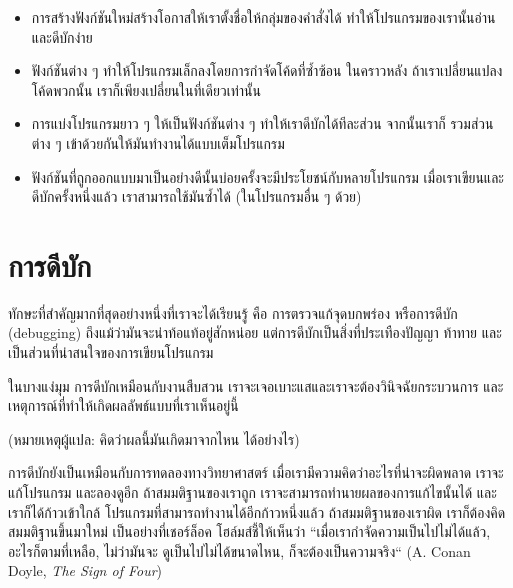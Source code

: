 \begin{itemize}

\item การสร้างฟังก์ชันใหม่สร้างโอกาสให้เราตั้งชื่อให้กลุ่มของคำสั่งได้ ทำให้โปรแกรมของเรานั้นอ่านและดีบักง่าย

\item ฟังก์ชันต่าง ๆ ทำให้โปรแกรมเล็กลงโดยการกำจัดโค้ดที่ซ้ำซ้อน  ในคราวหลัง ถ้าเราเปลี่ยนแปลงโค้ดพวกนั้น 
เราก็เพียงเปลี่ยนในที่เดียวเท่านั้น

\item การแบ่งโปรแกรมยาว ๆ ให้เป็นฟังก์ชันต่าง ๆ ทำให้เราดีบักได้ทีละส่วน จากนั้นเราก็
รวมส่วนต่าง ๆ เข้าด้วยกันให้มันทำงานได้แบบเต็มโปรแกรม

\item ฟังก์ชันที่ถูกออกแบบมาเป็นอย่างดีนั้นบ่อยครั้งจะมีประโยชน์กับหลายโปรแกรม เมื่อเราเขียนและดีบักครั้งหนึ่งแล้ว
เราสามารถใช้มันซ้ำได้ (ในโปรแกรมอื่น ๆ ด้วย)

\end{itemize}


\section{การดีบัก}

ทักษะที่สำคัญมากที่สุดอย่างหนึ่งที่เราจะได้เรียนรู้ คือ การตรวจแก้จุดบกพร่อง หรือการดีบัก (debugging)
ถึงแม้ว่ามันจะน่าท้อแท้อยู่สักหน่อย แต่การดีบักเป็นสิ่งที่ประเทืองปัญญา ท้าทาย 
และเป็นส่วนที่น่าสนใจของการเขียนโปรแกรม 


ในบางแง่มุม การดีบักเหมือนกับงานสืบสวน เราจะเจอเบาะแสและเราจะต้องวินิจฉัยกระบวนการ
และเหตุการณ์ที่ทำให้เกิดผลลัพธ์แบบที่เราเห็นอยู่นี้ 

(หมายเหตุผู้แปล: คิดว่าผลนี้มันเกิดมาจากไหน ได้อย่างไร)

การดีบักยังเป็นเหมือนกับการทดลองทางวิทยาศาสตร์ เมื่อเรามีความคิดว่าอะไรที่น่าจะผิดพลาด เราจะแก้โปรแกรม
และลองดูอีก ถ้าสมมติฐานของเราถูก เราจะสามารถทำนายผลของการแก้ไขนั้นได้ และเราก็ได้ก้าวเข้าใกล้
โปรแกรมที่สามารถทำงานได้อีกก้าวหนึ่งแล้ว ถ้าสมมติฐานของเราผิด เราก็ต้องคิดสมมติฐานขึ้นมาใหม่
เป็นอย่างที่เชอร์ล็อค โฮล์มส์ชี้ให้เห็นว่า ``เมื่อเรากำจัดความเป็นไปไม่ได้แล้ว, อะไรก็ตามที่เหลือ, ไม่ว่ามันจะ
ดูเป็นไปไม่ได้ขนาดไหน, ก็จะต้องเป็นความจริง`` (A. Conan Doyle, {\em The Sign of Four})

